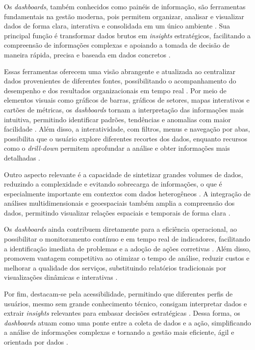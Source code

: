 \documentclass[
    12pt
    ,oneside
    ,a4paper
    ,chapter=TITLE
    ,section=TITLE
    ,sumario=abnt-6027-2012]{abntex2}
\begin{document}
Os \textit{dashboards}, também conhecidos como painéis de informação, são ferramentas fundamentais na gestão moderna, pois permitem organizar, analisar e visualizar dados de forma clara, interativa e consolidada em um único ambiente \cite{ufms2024}. Sua principal função é transformar dados brutos em \textit{insights} estratégicos, facilitando a compreensão de informações complexas e apoiando a tomada de decisão de maneira rápida, precisa e baseada em dados concretos \cite{rolim2020}.

Essas ferramentas oferecem uma visão abrangente e atualizada ao centralizar dados provenientes de diferentes fontes, possibilitando o acompanhamento do desempenho e dos resultados organizacionais em tempo real \cite{ufms2024}. Por meio de elementos visuais como gráficos de barras, gráficos de setores, mapas interativos e cartões de métricas, os \textit{dashboards} tornam a interpretação das informações mais intuitiva, permitindo identificar padrões, tendências e anomalias com maior facilidade \cite{campos2023}. Além disso, a interatividade, com filtros, menus e navegação por abas, possibilita que o usuário explore diferentes recortes dos dados, enquanto recursos como o \textit{drill-down} permitem aprofundar a análise e obter informações mais detalhadas \cite{campos2023}.

Outro aspecto relevante é a capacidade de sintetizar grandes volumes de dados, reduzindo a complexidade e evitando sobrecarga de informações, o que é especialmente importante em contextos com dados heterogêneos \cite{rolim2020}. A integração de análises multidimensionais e geoespaciais também amplia a compreensão dos dados, permitindo visualizar relações espaciais e temporais de forma clara \cite{ufms2024}.

Os \textit{dashboards} ainda contribuem diretamente para a eficiência operacional, ao possibilitar o monitoramento contínuo e em tempo real de indicadores, facilitando a identificação imediata de problemas e a adoção de ações corretivas \cite{ufms2024}. Além disso, promovem vantagem competitiva ao otimizar o tempo de análise, reduzir custos e melhorar a qualidade dos serviços, substituindo relatórios tradicionais por visualizações dinâmicas e interativas \cite{rolim2020}.

Por fim, destacam-se pela acessibilidade, permitindo que diferentes perfis de usuários, mesmo sem grande conhecimento técnico, consigam interpretar dados e extrair \textit{insights} relevantes para embasar decisões estratégicas \cite{ufms2024}. Dessa forma, os \textit{dashboards} atuam como uma ponte entre a coleta de dados e a ação, simplificando a análise de informações complexas e tornando a gestão mais eficiente, ágil e orientada por dados \cite{campos2023}.
\end{document}
